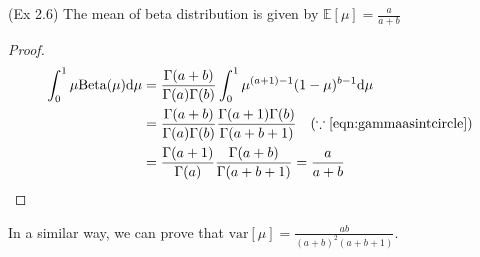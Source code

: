\begin{conclusion}
(Ex 2.6) The mean of beta distribution is given by $\mathbb{E}[\mu]=\frac{a}{a+b}$
\end{conclusion}
\begin{proof}
\begin{equation}
\begin{split}
\int_{0}^{1}\mu\text{Beta}(\mu)\text{d}\mu&=\frac{\Gamma(a+b)}{\Gamma(a)\Gamma(b)}\int_{0}^{1}\mu^{(a+1)-1}(1-\mu)^{b-1}\text{d}\mu\\
&=\frac{\Gamma(a+b)}{\Gamma(a)\Gamma(b)}\frac{\Gamma(a+1)\Gamma(b)}{\Gamma(a+b+1)}\quad(\because\text{\eqref{eqn:gammaasintcircle}})\\
&=\frac{\Gamma(a+1)}{\Gamma(a)}\frac{\Gamma(a+b)}{\Gamma(a+b+1)}=\frac{a}{a+b}\\
\end{split}
\end{equation}
\end{proof}
In a similar way, we can prove that $\text{var}[\mu]=\frac{ab}{(a+b)^2(a+b+1)}$.
